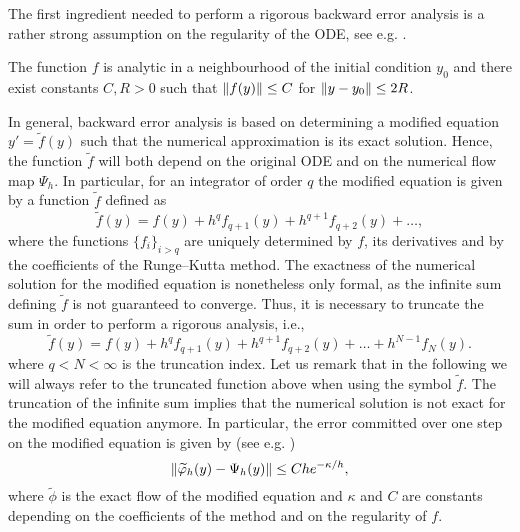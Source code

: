 \documentclass[10pt]{article}
\begin{document}
The first ingredient needed to perform a rigorous backward error analysis is a rather strong assumption on the regularity of the ODE, see e.g. \cite[Section IX.7]{HLW06}.
\begin{assumption}\label{as:RegHamiltonian} The function $f$ is analytic in a neighbourhood of the initial condition $y_0$ and there exist constants $C, R > 0$ such that $\lVert f(y)\rVert \leq C$ for $\lVert y - y_0\rVert \leq 2R$.
\end{assumption}
In general, backward error analysis is based on determining a modified equation $y' = \tilde f(y)$ such that the numerical approximation is its exact solution. Hence, the function $\tilde f$ will both depend on the original ODE and on the numerical flow map $\Psi_h$. In particular, for an integrator of order $q$ the modified equation is given by a function $\tilde f$ defined as
\begin{equation}
\tilde f(y) = f(y) + h^q f_{q+1}(y) + h^{q+1} f_{q+2}(y) + \ldots,
\end{equation}
where the functions $\{f_i\}_{i>q}$ are uniquely determined by $f$, its derivatives and by the coefficients of the Runge--Kutta method. The exactness of the numerical solution for the modified equation is nonetheless only formal, as the infinite sum defining $\tilde f$ is not guaranteed to converge. Thus, it is necessary to truncate the sum in order to perform a rigorous analysis, i.e.,
\begin{equation}\label{eq:ModifiedRHS}
\tilde f(y) = f(y) + h^q f_{q+1}(y) + h^{q+1} f_{q+2}(y) + \ldots + h^{N-1}f_N(y).
\end{equation}
where $q < N < \infty$ is the truncation index. Let us remark that in the following we will always refer to the truncated function above when using the symbol $\tilde f$. The truncation of the infinite sum implies that the numerical solution is not exact for the modified equation anymore. In particular, the error committed over one step on the modified equation is given by (see e.g. \cite[Theorem IX.7.6]{HLW06})
\begin{equation}\label{eq:OneStepModEq}
\lVert\widetilde {\varphi}_h(y) - \Psi_h(y)\rVert \leq Che^{-\kappa/h},
\end{equation}
where $\tilde \phi$ is the exact flow of the modified equation and $\kappa$ and $C$ are constants depending on the coefficients of the method and on the regularity of $f$.
\end{document}
